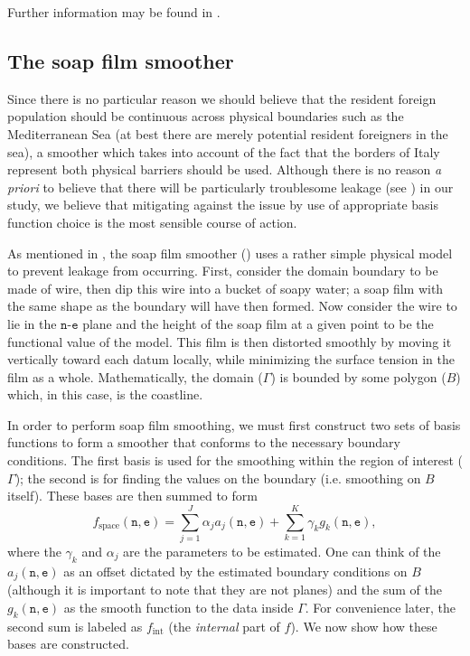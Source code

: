 Further information may be found in .

\subsection{The soap film smoother \label{SF}}

Since there is no particular reason we should believe that the resident foreign population should be continuous across physical boundaries such as the Mediterranean Sea (at best there are merely potential resident foreigners in the sea), a smoother which takes into account of the fact that the borders of Italy represent both physical barriers should be used. Although there is no reason \textit{a priori} to believe that there will be particularly troublesome leakage (see ) in our study, we believe that mitigating against the issue by use of appropriate basis function choice is the most sensible course of action. 

As mentioned in , the soap film smoother (\cite{soap}) uses a rather simple physical model to prevent leakage from occurring. First, consider the domain boundary to be made of wire, then dip this wire into a bucket of soapy water; a soap film with the same shape as the boundary will have then formed. Now consider the wire to lie in the $\texttt{n}$-$\texttt{e}$ plane and the height of the soap film at a given point to be the functional value of the model. This film is then distorted smoothly by moving it vertically toward each datum locally, while minimizing the surface tension in the film as a whole. Mathematically, the domain ($\Gamma$) is bounded by some polygon ($B$) which, in this case, is the coastline.

In order to perform soap film smoothing, we must first construct two sets of basis functions to form a smoother that conforms to the necessary boundary conditions. The first basis is used for the smoothing within the region of interest ($\Gamma$); the second is for finding the values on the boundary (i.e. smoothing on $B$ itself). These bases are then summed to form
$$
f_\text{space}(\texttt{n},\texttt{e})=\sum_{j=1}^J \alpha_j a_j(\texttt{n},\texttt{e}) + \sum_{k=1}^K \gamma_k g_k(\texttt{n},\texttt{e}),
$$
where the $\gamma_k$ and $\alpha_j$ are the parameters to be estimated. One can think of the $a_j(\texttt{n},\texttt{e})$ as an offset dictated by the estimated boundary conditions on $B$ (although it is important to note that they are not planes) and the sum of the $g_k(\texttt{n},\texttt{e})$ as the smooth function to the data inside $\Gamma$. For convenience later, the second sum is labeled as $f_\text{int}$ (the \textit{internal} part of $f$). We now show how these bases are constructed.

